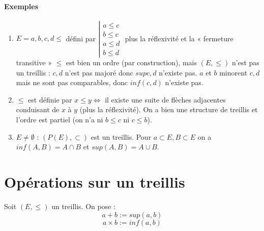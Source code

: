 \documentclass[11pt]{article}
\begin{document}
        \paragraph{Exemples}
            \begin{enumerate}
                \item $E={a,b,c,d}\leq$ défini par $\left|\begin{matrix}a\leq c\\b\leq c\\a\leq d\\b\leq d\end{matrix}\right.$ plus la réflexivité et la « fermeture transitive » $\leq$ est bien un ordre (par construction), mais $(E,\leq)$ n'est pas un treillis : ${c,d}$ n'est pas majoré donc $sup{c,d}$ n'existe pas. $a$ et $b$ minorent ${c,d}$ mais ne sont pas comparables, donc $inf(c,d)$ n'existe pas.
                \item $\leq$ est définie par $x\leq y\Leftrightarrow$ il existe une suite de flèches adjacentes conduisant de $x$ à $y$ (plus la réflexivité). On a bien une structure de treillis et l'ordre est partiel (on n'a ni $b\leq c$ ni $c\leq b$).
                \item $E\neq\emptyset$ : $(P(E),\subset)$ est un treillis. Pour $a\subset E,B\subset E$ on a $inf(A,B)=A\cap B$ et $sup(A,B)=A\cup B$.
            \end{enumerate}

    \section{Opérations sur un treillis}
        Soit $(E,\leq)$ un treillis. On pose :
        $$
            a+b:=sup(a,b)
        $$$$
            a\times b:=inf(a,b)
        $$
\end{document}
